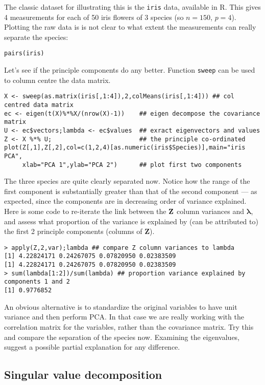 \documentclass[10pt] {article}
\newcommand{\eps}[3]
{{\begin{center}
 \rotatebox{#1}{\scalebox{#2}{\texttt{[image: \#3]}}}
 \end{center}}
}
\theoremstyle{definition}
\begin{document}
The classic dataset for illustrating this is the {\tt iris} data, available in R. This gives 4 measurements for each of 50 iris flowers of 3 species (so $n=150$, $p=4$). Plotting the raw data is is not clear to what extent the measurements can really separate the species:
\begin{lstlisting}
pairs(iris)
\end{lstlisting}
\eps{-90}{0.5}{iris.eps}
Let's see if the principle components do any better. Function {\tt sweep} can be used to column centre the data matrix.
\begin{lstlisting}
X <- sweep(as.matrix(iris[,1:4]),2,colMeans(iris[,1:4])) ## col centred data matrix
ec <- eigen(t(X)%*%X/(nrow(X)-1))    ## eigen decompose the covariance matrix
U <- ec$vectors;lambda <- ec$values  ## exract eigenvectors and values
Z <- X %*% U;                        ## the principle co-ordinated 
plot(Z[,1],Z[,2],col=c(1,2,4)[as.numeric(iris$Species)],main="iris PCA",
     xlab="PCA 1",ylab="PCA 2")      ## plot first two components  
\end{lstlisting}
\eps{-90}{0.5}{iris-pca.eps}
The three species are quite clearly separated now. Notice how the range of the first component is substantially greater than that of the second component --- as expected, since the components are in decreasing order of variance explained. Here is some code to re-iterate the link between the ${\bf Z}$ column variances and ${\bm \lambda}$, and assess what proportion of the variance is explained by (can be attributed to) the first 2 principle components (columns of {\bf Z}).    
\begin{lstlisting}
> apply(Z,2,var);lambda ## compare Z column variances to lambda
[1] 4.22824171 0.24267075 0.07820950 0.02383509
[1] 4.22824171 0.24267075 0.07820950 0.02383509
> sum(lambda[1:2])/sum(lambda) ## proportion variance explained by components 1 and 2
[1] 0.9776852
\end{lstlisting}

 An obvious alternative is to standardize the original variables to have unit variance and then perform PCA. In that case we are really working with the correlation matrix for the variables, rather than the covariance matrix. Try this and compare the separation of the species now. Examining the eigenvalues, suggest a possible partial explanation for any difference.

\subsection{Singular value decomposition}
\end{document}
